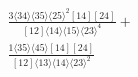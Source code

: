 \documentclass[varwidth, border=5pt]{standalone}
\begin{document}
\begin{my}
$\begin{gathered}
\scriptscriptstyle\frac{3⟨34⟩⟨35⟩⟨25⟩^2[14][24]}{[12]⟨14⟩⟨15⟩⟨23⟩^4}+\\
\scriptscriptstyle\frac{1⟨35⟩⟨45⟩[14][24]}{[12]⟨13⟩⟨14⟩⟨23⟩^2}\phantom{+}
\end{gathered}$
\end{my}
\end{document}
